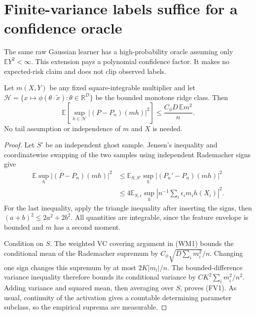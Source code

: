 \section{Finite-variance labels suffice for a confidence oracle}
\label{sec:finite-variance-midpoint}
The same raw Gaussian learner has a high-probability oracle assuming only
$\mathbb E Y^2<\infty$. This extension pays a polynomial confidence factor.
It makes no expected-risk claim and does not clip observed labels.

\begin{lemma}
\label{lem:weighted-second-moment}
Let $m(X,Y)$ be any fixed square-integrable multiplier and let
$\mathcal H=\{x\mapsto\phi(\theta\cdot\widetilde x):\theta\in\mathbb R^D\}$
be the bounded monotone ridge class. Then
\[
 \mathbb E\left[\sup_{h\in\mathcal H}
             |(P-P_n)(mh)|^2\right]
 \le\frac{C_\phi D\,\mathbb E m^2}{n}.                 \tag{FV1}
\]
No tail assumption or independence of $m$ and $X$ is needed.
\end{lemma}
\begin{proof}
Let $S'$ be an independent ghost sample. Jensen's inequality and
coordinatewise swapping of the two samples using independent Rademacher
signs give
\begin{align*}
 \mathbb E\sup_h|(P-P_n)(mh)|^2
 &\le\mathbb E_{S,S'}\sup_h|(P_n'-P_n)(mh)|^2\\
 &\le4\mathbb E_{S,\epsilon}\sup_h
           \left|n^{-1}\sum_i\epsilon_i m_i h(X_i)\right|^2.
\end{align*}
For the last inequality, apply the triangle inequality after inserting
the signs, then $(a+b)^2\le2a^2+2b^2$.
All quantities are integrable, since the feature envelope is bounded
and $m$ has a second moment.

Condition on $S$. The weighted VC covering argument in (WM1) bounds
the conditional mean of the Rademacher supremum by
$C_\phi\sqrt{D\sum_i m_i^2}/n$.
Changing one sign changes this supremum by at most $2K|m_i|/n$.
The bounded-difference variance inequality therefore bounds its
conditional variance by $C K^2\sum_i m_i^2/n^2$.
Adding variance and squared mean, then averaging over $S$, proves (FV1).
As usual, continuity of the activation gives a countable determining
parameter subclass, so the empirical suprema are measurable.
\end{proof}

